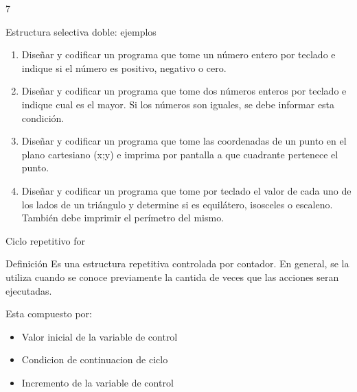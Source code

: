7\documentclass[xcolor=pdftex,table,11pt]{beamer}
\begin{document}
\begin{frame}{Estructura selectiva doble: ejemplos}
 \begin{enumerate}
   
     	\item Diseñar y codificar un programa que tome un número entero por teclado e indique si el número es positivo, negativo o cero.     	
\href{https://github.com/danis963/informaticaI_IUA/blob/main/c/src/2-2_if_else.c}{}



     	\item Diseñar y codificar un programa que tome dos números enteros por teclado e indique cual es el mayor. Si los números son iguales, se debe informar esta condición.
     	
	\href{https://github.com/danis963/informaticaI_IUA/blob/main/c/src/2-3_if_else.c}{}

     	\item Diseñar y codificar un programa que tome las coordenadas de un punto en el plano cartesiano (x;y) e imprima por pantalla a que cuadrante pertenece el punto.


	\href{https://github.com/danis963/informaticaI_IUA/blob/main/c/src/2-4_if_else.c}{}
   
   
   
       \item Diseñar y codificar un programa que tome por teclado el valor de cada uno de los lados de un triángulo y determine si es equilátero, isosceles o escaleno. También debe imprimir el perímetro del mismo.


	\href{https://github.com/danis963/informaticaI_IUA/blob/main/c/src/2-5_if_else.c}{}
   \end{enumerate}
   

\end{frame}

\begin{frame}{Ciclo repetitivo for}

\begin{block}{Definición}
Es una estructura repetitiva controlada por contador. En general, se la utiliza cuando se conoce previamente la cantida de veces que las acciones seran ejecutadas.
\end{block}

Esta compuesto por:

\begin{itemize}
\item Valor inicial de la variable de control
\item Condicion de continuacion de ciclo
\item Incremento de la variable de control
\end{itemize}

\end{frame}
\end{document}
